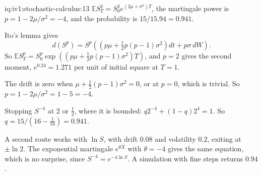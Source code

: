 \begin{solution}{iq:iv1:stochastic-calculus:13}
$\mathbb{E}S_T^2 = S_0^2e^{(2\mu + \sigma^2)T}$, the martingale power is $p = 1 - 2\mu/\sigma^2 = -4$, and the probability is $15/15.94 = 0.941$.

Ito's lemma gives
\[
d(S^p) = S^p\left(\left(p\mu + \tfrac12p(p - 1)\sigma^2\right)dt + p\sigma\,dW\right).
\]
So $\mathbb{E}S_T^p = S_0^p\exp((p\mu + \frac12p(p - 1)\sigma^2)T)$, and $p = 2$ gives the second moment, $e^{0.24} = 1.271$ per unit of initial square at $T = 1$.

The drift is zero when $\mu + \frac12(p - 1)\sigma^2 = 0$, or at $p = 0$, which is trivial. So $p = 1 - 2\mu/\sigma^2 = 1 - 5 = -4$.

Stopping $S^{-4}$ at $2$ or $\frac12$, where it is bounded: $q2^{-4} + (1 - q)2^4 = 1$. So $q = 15/(16 - \frac{1}{16}) = 0.941$.

A second route works with $\ln S$, with drift $0.08$ and volatility $0.2$, exiting at $\pm\ln 2$. The exponential martingale $e^{\theta X}$ with $\theta = -4$ gives the same equation, which is no surprise, since $S^{-4} = e^{-4\ln S}$. A simulation with fine steps returns $0.94$.



\end{solution}

